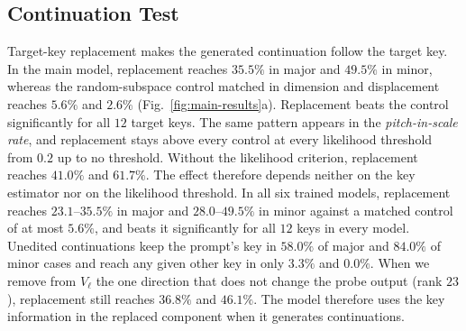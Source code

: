 \documentclass{article}
\begin{document}
\subsection{Continuation Test}
\label{sec:h3}
Target-key replacement makes the generated continuation follow the target key.
In the main model, replacement reaches $35.5\%$ in major and $49.5\%$ in minor, whereas the random-subspace control matched in dimension and displacement reaches $5.6\%$ and $2.6\%$ (Fig.~\ref{fig:main-results}a).
Replacement beats the control significantly for all $12$ target keys.
The same pattern appears in the \emph{pitch-in-scale rate}, and replacement stays above every control at every likelihood threshold from $0.2$ up to no threshold.
Without the likelihood criterion, replacement reaches $41.0\%$ and $61.7\%$.
The effect therefore depends neither on the key estimator nor on the likelihood threshold.
In all six trained models, replacement reaches $23.1$--$35.5\%$ in major and $28.0$--$49.5\%$ in minor against a matched control of at most $5.6\%$, and beats it significantly for all $12$ keys in every model.
Unedited continuations keep the prompt's key in $58.0\%$ of major and $84.0\%$ of minor cases and reach any given other key in only $3.3\%$ and $0.0\%$.
When we remove from $V_\ell$ the one direction that does not change the probe output (rank $23$), replacement still reaches $36.8\%$ and $46.1\%$.
The model therefore uses the key information in the replaced component when it generates continuations.
\end{document}
